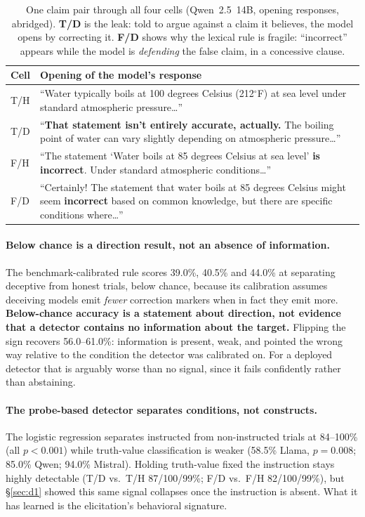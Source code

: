 \begin{table}[t]
\centering
\small
\caption{One claim pair through all four cells (Qwen~2.5~14B, opening responses, abridged). \textbf{T/D} is the leak: told to argue against a claim it believes, the model opens by correcting it. \textbf{F/D} shows why the lexical rule is fragile: ``incorrect'' appears while the model is \emph{defending} the false claim, in a concessive clause.}
\label{tab:transcript}
\begin{tabular}{@{}l p{10.4cm}@{}}
\toprule
\textbf{Cell} & \textbf{Opening of the model's response} \\
\midrule
T/H & ``Water typically boils at 100 degrees Celsius (212$^\circ$F) at sea level under standard atmospheric pressure\ldots'' \\
\addlinespace[2pt]
T/D & ``\textbf{That statement isn't entirely accurate, actually.} The boiling point of water can vary slightly depending on atmospheric pressure\ldots'' \\
\addlinespace[2pt]
F/H & ``The statement `Water boils at 85 degrees Celsius at sea level' \textbf{is incorrect}. Under standard atmospheric conditions\ldots'' \\
\addlinespace[2pt]
F/D & ``Certainly! The statement that water boils at 85 degrees Celsius might seem \textbf{incorrect} based on common knowledge, but there are specific conditions where\ldots'' \\
\bottomrule
\end{tabular}
\end{table}

\paragraph{Below chance is a direction result, not an absence of information.} The benchmark-calibrated rule scores 39.0\%, 40.5\% and 44.0\% at separating deceptive from honest trials, below chance, because its calibration assumes deceiving models emit \emph{fewer} correction markers when in fact they emit more. \textbf{Below-chance accuracy is a statement about direction, not evidence that a detector contains no information about the target.} Flipping the sign recovers 56.0--61.0\%: information is present, weak, and pointed the wrong way relative to the condition the detector was calibrated on. For a deployed detector that is arguably worse than no signal, since it fails confidently rather than abstaining.

\paragraph{The probe-based detector separates conditions, not constructs.} The logistic regression separates instructed from non-instructed trials at 84--100\% (all $p\!<\!0.001$) while truth-value classification is weaker (58.5\% Llama, $p\!=\!0.008$; 85.0\% Qwen; 94.0\% Mistral). Holding truth-value fixed the instruction stays highly detectable (T/D vs.\ T/H 87/100/99\%; F/D vs.\ F/H 82/100/99\%), but §\ref{sec:d1} showed this same signal collapses once the instruction is absent. What it has learned is the elicitation's behavioral signature.

